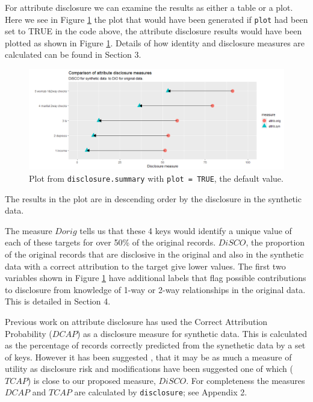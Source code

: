 \documentclass[12pt]{article}
\begin{document}
For attribute disclosure we can examine the results as either a table or a plot. Here we see in Figure \ref{fig:f1} the plot that would have been generated if \texttt{plot} had been set to TRUE in the code above, the attribute disclosure results would have been plotted as shown in Figure \ref{fig:f1}. Details of how identity and disclosure measures are calculated can be found in Section 3.
\begin{figure}[ht]
  \centering
  \includegraphics[width=1\linewidth]{fig1dis.png}
  \caption{Plot from \texttt{disclosure.summary} with \texttt{plot = TRUE}, the default value.}
  \label{fig:f1}
\end{figure}

The results in the plot are in descending order by the disclosure in the synthetic data.

The measure $Dorig$ tells us that these 4 keys would identify a unique value of each of these targets for over 50\% of the original records. $DiSCO$, the proportion of the original records that are disclosive in the original and also in the synthetic data with a correct attribution to the target give lower values. The first two variables shown in Figure \ref{fig:f1} have additional labels that 
flag possible contributions to disclosure from knowledge of 1-way or 2-way relationships in the original data. This is detailed in Section 4. 

Previous work on attribute disclosure \cite{elliot2014SYLLS,taub_PSD2018} has used the Correct Attribution Probability ($DCAP$) as a disclosure measure for synthetic data. This is calculated as the percentage of records correctly predicted from the synethetic data by a set of keys.  However it has been suggested \cite{raabpersonal, ChenUNECE2019}, that it may be as much a measure of utility as disclosure risk and modifications have been suggested \cite{taubUNECE2019,little2022} one of which ($TCAP$) is close to our proposed measure, $DiSCO$. For completeness the measures $DCAP$ and $TCAP$ are calculated by \texttt{disclosure}; see Appendix 2.
\end{document}
